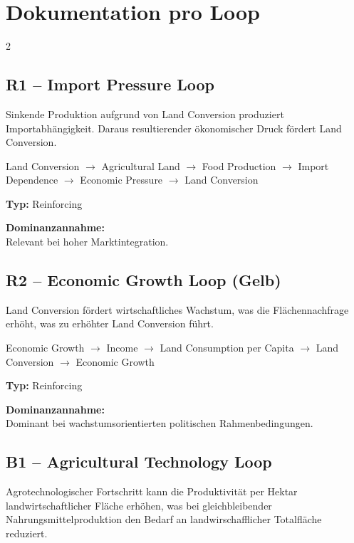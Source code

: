 \documentclass[10pt, a4paper]{article}
\begin{document}
\section*{\centering Dokumentation pro Loop}
\vspace{0.5cm}

\begin{multicols}{2}

\subsection*{R1 – Import Pressure Loop}
Sinkende Produktion aufgrund von Land Conversion produziert Importabhängigkeit. Daraus resultierender ökonomischer Druck fördert Land Conversion.

Land Conversion $\rightarrow$ Agricultural Land $\rightarrow$ Food Production $\rightarrow$ Import Dependence $\rightarrow$ Economic Pressure $\rightarrow$ Land Conversion

\textbf{Typ:} Reinforcing

\textbf{Dominanzannahme:}\\
Relevant bei hoher Marktintegration.

\vspace{0.5cm}

\subsection*{R2 – Economic Growth Loop (Gelb)}
Land Conversion fördert wirtschaftliches Wachstum, was die  Flächennachfrage erhöht, was zu erhöhter Land Conversion führt.

Economic Growth $\rightarrow$ Income $\rightarrow$ Land Consumption per Capita $\rightarrow$ Land Conversion $\rightarrow$ Economic Growth

\textbf{Typ:} Reinforcing

\textbf{Dominanzannahme:}\\
Dominant bei wachstumsorientierten politischen Rahmenbedingungen.

\vfill\columnbreak

\subsection*{B1 – Agricultural Technology Loop}
Agrotechnologischer Fortschritt kann die Produktivität per Hektar landwirtschaftlicher Fläche erhöhen, was bei gleichbleibender Nahrungsmittelproduktion den Bedarf an landwirschafflicher Totalfläche  reduziert.


\end{multicols}
\end{document}
